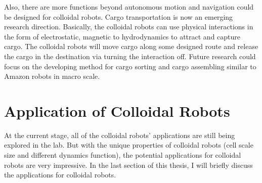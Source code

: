 Also, there are more functions beyond autonomous motion and navigation could be designed for colloidal robots. Cargo transportation is now an emerging research direction\autocite{demirors2018active,Martinez-Pedrero2015}. Basically, the colloidal robots can use physical interactions in the form of electrostatic, magnetic to hydrodynamics to attract and capture cargo. The colloidal robots will move cargo along some designed route and release the cargo in the destination via turning the interaction off. Future research could focus  on the developing method for cargo sorting and cargo assembling similar to Amazon robots in macro scale.


\section{Application of Colloidal Robots}
At the current stage, all of the colloidal robots' applications are still being explored in the lab. But with the unique properties of colloidal robots (cell scale size and different dynamics function), the potential applications for colloidal robots are very impressive. In the last section of this thesis, I will briefly discuss the applications for colloidal robots.


